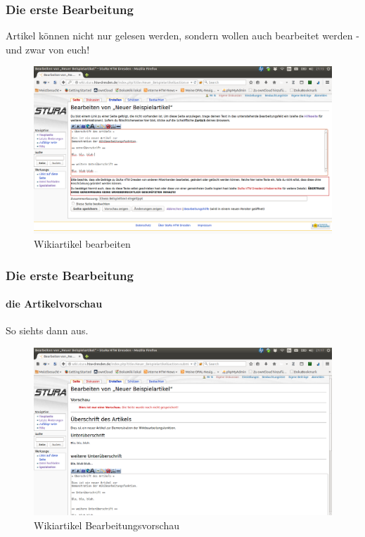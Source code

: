 \documentclass{beamer}              %
\begin{document}
\begin{frame}
  \frametitle{Die erste Bearbeitung}
  Artikel können nicht nur gelesen werden, sondern wollen auch bearbeitet
  werden - und zwar von euch!\\

	\begin{figure}[tbph]
	\centering
	\includegraphics[width=1\linewidth]{Wikiartikel_bearbeiten}
	\caption[Wikiartikel bearbeiten]{Wikiartikel bearbeiten}
	\label{fig:Wikiartikel_bearbeiten}
	\end{figure}
\end{frame}


\begin{frame}
  \frametitle{Die erste Bearbeitung}
  \framesubtitle{die Artikelvorschau}
  So siehts dann aus.\\

	\begin{figure}[tbph]
	\centering
	\includegraphics[width=1\linewidth]{Wikiartikel_Bearbeitungsvorschau}
	\caption[Wikiartikel bearbeiten]{Wikiartikel Bearbeitungsvorschau}
	\label{fig:Wikiartikel_Bearbeitungsvorschau}
	\end{figure}
\end{frame}
\end{document}
